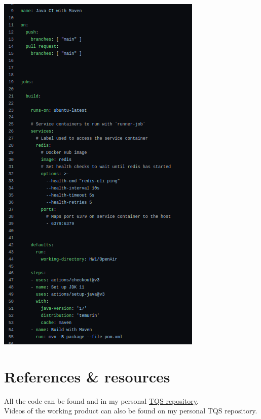 \documentclass[12pt]{article}
\begin{document}
\begin{center}
\includegraphics[scale=0.6]{CompleteIntegration.png}
\end{center}

\section{References \& resources}

All the code can be found and in my personal \href{https://github.com/Rafael-Remigio/TQS_102435/tree/main/HW1}{TQS repository}.\\
Videos of the working product can also be found on my personal TQS repository.
\end{document}
